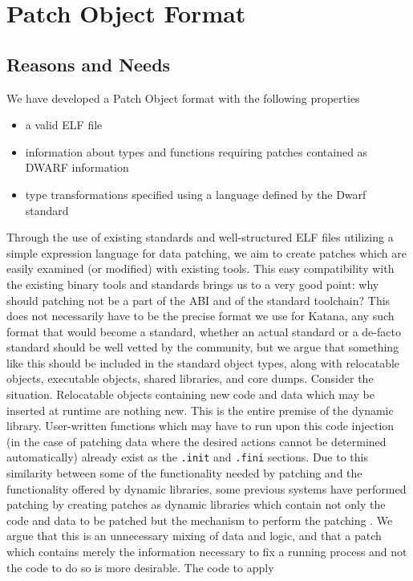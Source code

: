\section{Patch Object Format}
\label{sec:poformat}
\subsection{Reasons and Needs}
We have developed a Patch Object format with the following properties
\begin{itemize}
 \item a valid ELF file
 \item information about types and functions requiring patches contained
   as DWARF information
 \item type transformations specified using a language defined by the
   Dwarf standard
\end{itemize}
Through the use of existing standards and well-structured ELF files
utilizing a simple expression language for data patching, we aim to
create patches which are easily examined (or modified) with existing
tools. This easy compatibility with the existing binary tools and
standards brings us to a very good point: why should patching not be a
part of the ABI and of the standard toolchain? This does not
necessarily have to be the precise format we use for Katana, any such
format that would become a standard, whether an actual standard or a
de-facto standard should be well vetted by the community, but we argue
that something like this should be included in the standard object
types, along with relocatable objects, executable objects, shared
libraries, and core dumps. Consider the situation. Relocatable objects
containing new code and data which may be inserted at runtime are
nothing new. This is the entire premise of the dynamic
library. User-written functions which may have to run upon this code
injection (in the case of patching data where the desired actions
cannot be determined automatically) already exist as the
\texttt{.init} and \texttt{.fini} sections. Due to this similarity
between some of the functionality needed by patching and the
functionality offered by dynamic
libraries, some previous systems have performed patching by creating
patches as dynamic libraries which contain not only the code and data
to be patched but the mechanism to perform the patching \cite{ginseng}
\cite{polus}. We argue that
this is an unnecessary mixing of data and logic, and that a patch
which contains merely the information necessary to fix a running
process and not the code to do so is more desirable. The code to apply
